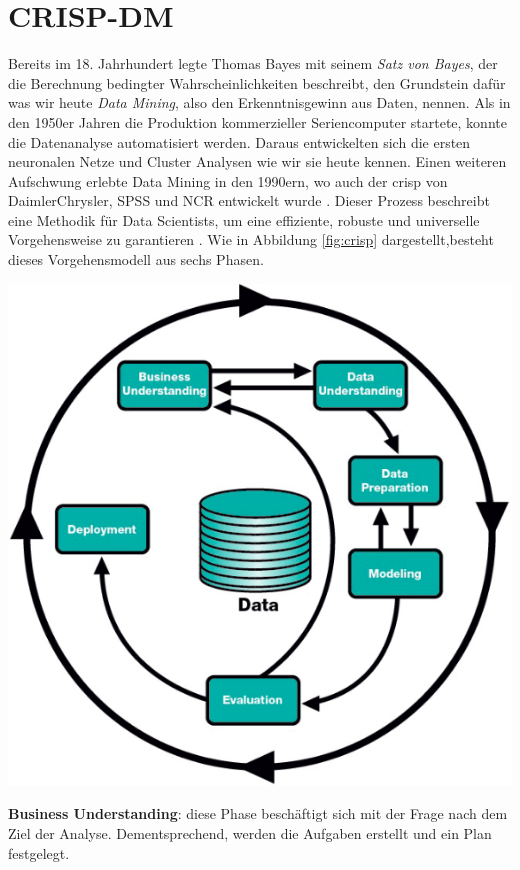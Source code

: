 \documentclass[
    12pt, %
    DIV10,
    ngerman, %
    a4paper, %
    oneside, %
    titlepage, %
    parskip=half, %
    headings=normal, %
    listof=totoc, %
    bibliography=totoc, %
    index=totoc, %
    captions=tableheading, %
    final %
]{scrreprt}
\begin{document}
\section{CRISP-DM}
\label{sec:crisp}
Bereits im 18. Jahrhundert legte Thomas Bayes mit seinem \emph{Satz von Bayes}, der die Berechnung bedingter Wahrscheinlichkeiten beschreibt, den Grundstein dafür was wir heute \emph{Data Mining}, also den Erkenntnisgewinn aus Daten, nennen. Als in den 1950er Jahren die Produktion kommerzieller Seriencomputer startete, konnte die Datenanalyse automatisiert werden. Daraus entwickelten sich die ersten neuronalen Netze und Cluster Analysen wie wir sie heute kennen. Einen weiteren Aufschwung erlebte Data Mining in den 1990ern, wo auch der \ac{crisp} von DaimlerChrysler, SPSS und NCR entwickelt wurde \parencite{SmartVisionEurop}.
Dieser Prozess beschreibt eine Methodik für Data Scientists, um eine effiziente, robuste und universelle Vorgehensweise zu garantieren \parencite{chapman1999crisp}. Wie in Abbildung \ref{fig:crisp} dargestellt,besteht dieses Vorgehensmodell aus sechs Phasen.
\begin{center}
\includegraphics[scale=0.5]{img/crisp.png}
\label{fig:crisp}
\end{center}
\textbf{Business Understanding}: diese Phase beschäftigt sich mit der Frage nach dem Ziel der Analyse. Dementsprechend, werden die Aufgaben erstellt und ein Plan festgelegt.\\
\end{document}
